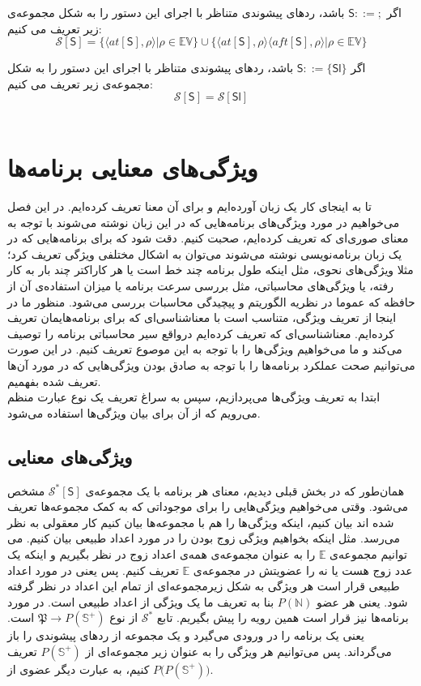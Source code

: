 اگر $         \mathsf{S} ::=;  $ باشد، ردهای پیشوندی متناظر با اجرای این دستور را به شکل مجموعه‌ی زیر تعریف می کنیم:
$$\mathcal{S} [\mathsf{S}] = \{ \langle at[\mathsf{S}] , \rho \rangle | \rho \in \mathbb{EV}       \} \cup     \{ \langle at[\mathsf{S}] , \rho \rangle \langle aft[\mathsf{S}] , \rho \rangle | \rho \in \mathbb{EV}       \}             $$  


اگر $         \mathsf{S} ::=\{\mathsf{Sl}\}  $ باشد، ردهای پیشوندی متناظر با اجرای این دستور را به شکل مجموعه‌ی زیر تعریف می کنیم:
$$\mathcal{S} [\mathsf{S}] = \mathcal{S} [\mathsf{Sl}] $$   \\

\section{ویژگی‌های معنایی برنامه‌ها}
تا به اینجای کار یک زبان آورده‌ایم و برای آن معنا تعریف کرده‌ایم. در این فصل می‌خواهیم در مورد ویژگی‌های برنامه‌هایی که در این زبان نوشته می‌شوند با توجه به معنای صوری‌ای که تعریف کرده‌ایم، صحبت کنیم. دقت شود که برای برنامه‌هایی که در یک زبان برنامه‌نویسی نوشته می‌شوند می‌توان به اشکال مختلفی ویژگی تعریف کرد؛ مثلا ویژگی‌های نحوی، مثل اینکه طول برنامه چند خط است یا هر کاراکتر چند بار به کار رفته، یا ویژگی‌های محاسباتی، مثل بررسی‌ سرعت برنامه یا میزان استفاده‌ی آن از حافظه که عموما در نظریه الگوریتم و پیچیدگی محاسبات بررسی می‌شود. منظور ما در اینجا از تعریف ویژگی، متناسب است با معناشناسی‌ای که برای برنامه‌هایمان تعریف کرده‌ایم. معناشناسی‌ای که تعریف کرده‌ایم درواقع سیر محاسباتی برنامه را توصیف می‌کند و ما می‌خواهیم ویژگی‌ها را با توجه به این موصوع تعریف کنیم. در این صورت می‌توانیم صحت عملکرد برنامه‌ها را با توجه به صادق بودن ویژگی‌هایی که در مورد آن‌ها تعریف شده بفهمیم.\\
ابتدا به تعریف ویژگی‌ها می‌پردازیم، سپس به سراغ تعریف یک نوع عبارت منظم می‌رویم که از آن برای بیان ویژگی‌ها استفاده می‌شود.
\subsection{ویژگی‌های معنایی}
همان‌طور که در بخش قبلی دیدیم، معنای هر برنامه با یک مجموعه‌ی 
$\mathcal{S^*} [\mathsf{S}]$
مشخص می‌شود. وقتی می‌خواهیم ویژگی‌هایی را برای موجوداتی که به کمک مجموعه‌ها تعریف شده اند بیان کنیم، اینکه ویژگی‌ها را هم با مجموعه‌ها بیان کنیم کار معقولی به نظر می‌رسد. مثل اینکه بخواهیم ویژگی زوج بودن را در مورد اعداد طبیعی بیان کنیم. می توانیم مجموعه‌ی $\mathbb{E}$ را به عنوان مجموعه‌ی همه‌ی اعداد زوج در نظر بگیریم و اینکه یک عدد زوج هست یا نه را عضویتش در مجموعه‌ی $\mathbb{E}$ تعریف کنیم. پس یعنی در مورد اعداد طبیعی قرار است هر ویژگی به شکل زیرمجموعه‌ای از تمام این اعداد در نظر گرفته شود. یعنی هر عضو 
$\mathit{P}(\mathbb{N})$
بنا به تعریف ما یک ویژگی از اعداد طبیعی است.
در مورد برنامه‌ها نیز قرار است همین رویه را پیش بگیریم. تابع 
$\mathcal{S^*}$
از نوع 
$\mathfrak{P} \rightarrow \mathit{P}(\mathbb{S^+})$
است. یعنی یک برنامه را در ورودی می‌گیرد و یک مجموعه از ردهای پیشوندی را باز می‌گرداند. پس می‌توانیم هر ویژگی را به عنوان زیر مجموعه‌ای از 
$\mathit{P}(\mathbb{S^+})$
تعریف کنیم، به عبارت دیگر عضوی از
$\mathit{P(P}(\mathbb{S^+}))$.

